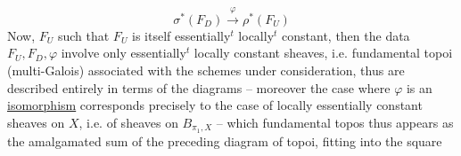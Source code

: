 \[
\boxed{\sigma^{*}(F_D)\xrightarrow{\varphi}\rho^{*}(F_U)}
\]
Now,   $F_U$ such that $F_U$ is
itself essentially$^{t}$ locally$^{t}$ constant, then the data
$F_U,F_D,\varphi$ involve only
essentially$^{t}$ locally constant sheaves, i.e.
fundamental topoi (multi-Galois)
associated with the schemes under consideration,  thus
are described entirely in terms of the
diagrams
\margin{(*)}
-- moreover the case where $\varphi$ is an \uline{isomorphism} corresponds
precisely to the case of locally essentially
constant sheaves on $X$, i.e. of sheaves on
$B_{\pi_1,X}$ -- which fundamental topos
thus appears as the amalgamated
sum of the preceding diagram of topoi,
fitting into the square

